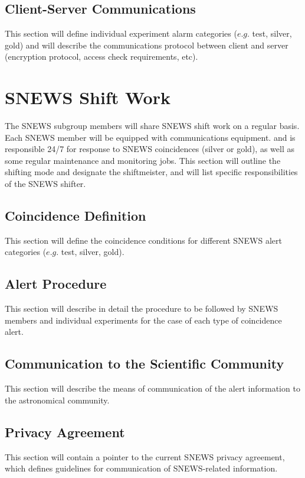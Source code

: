 \documentclass{article}
\begin{document}

\subsection{Client-Server Communications}

This section will define individual experiment alarm categories 
($e.g.$ test, silver, gold) and will describe the 
communications protocol between client and server (encryption
protocol, access check requirements, etc).

\section{SNEWS Shift Work}

The SNEWS subgroup members will share SNEWS shift work on
a regular basis.  Each SNEWS member will be equipped with
communications equipment.
and is responsible 24/7 for response to SNEWS coincidences
(silver or gold), as well as some regular maintenance and monitoring jobs.
This section will outline the shifting mode and designate
the shiftmeister, and will list specific responsibilities of the 
SNEWS shifter.


\subsection{Coincidence Definition}

This section will define the coincidence conditions for different
SNEWS alert categories ($e.g.$ test, silver, gold).

\subsection{Alert Procedure}

This section will describe in detail the procedure to be followed by
SNEWS members and individual experiments for the case of each type of
coincidence alert.

\subsection{Communication to the Scientific Community}

This section will describe the means of communication
of the alert information to the astronomical community.

\subsection{Privacy Agreement}
This section will contain a pointer to the current SNEWS privacy
agreement, which defines guidelines for communication
of SNEWS-related information.
\end{document}
